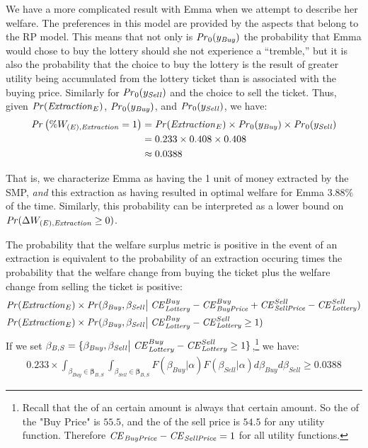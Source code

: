 \documentclass[../main.tex]{subfiles}
\begin{document}
We have a more complicated result with Emma when we attempt to describe her welfare.
The preferences in this model are provided by the aspects that belong to the RP model.
This means that not only is ${\mathit{Pr}}_0(y_{\mathit{Buy}})$ the probability that Emma would chose to buy the lottery should she not experience a \enquote{tremble,} but it is also the probability that the choice to buy the lottery is the result of greater utility being accumulated from the lottery ticket than is associated with the buying price.
Similarly for ${\mathit{Pr}}_0(y_{\mathit{Sell}})$ and the choice to sell the ticket.
Thus, given ${\mathit{Pr}}(\mathit{Extraction}_E)$, ${\mathit{Pr}}_0(y_{\mathit{Buy}})$, and ${\mathit{Pr}}_0(y_{\mathit{Sell}})$, we have:
\begin{align}
	\begin{split}
		{\ensuremath{\mathit{Pr}}}\left(\% W_{(E),\mathit{Extraction}} = 1\right) &= {\mathit{Pr}}(\mathit{Extraction}_E) \times {\ensuremath{\mathit{Pr}}}_0(y_{\mathit{Buy}}) \times {\ensuremath{\mathit{Pr}}}_0(y_{\mathit{Sell}})\\
		&= 0.233 \times 0.408 \times 0.408\\
		&\approx 0.0388
	\end{split}
\end{align}

That is, we characterize Emma as having the 1 unit of money extracted by the SMP, \textit{and} this extraction as having resulted in optimal welfare for Emma $3.88\%$ of the time.
Similarly, this probability can be interpreted as a lower bound on ${\mathit{Pr}}(\Delta W_{(E),\mathit{Extraction}} \geq 0)$.

The probability that the welfare surplus metric is positive in the event of an extraction is equivalent to the probability of an extraction occuring times the probability that the welfare change from buying the ticket plus the welfare change from selling the ticket is positive:
\begin{align*}
{\ensuremath{\mathit{Pr}}}(\mathit{Extraction}_E) &\times {\ensuremath{\mathit{Pr}}}(\beta_{\mathit{Buy}},\beta_{\mathit{Sell}} \big| \; {\mathit{CE}}_{\mathit{Lottery}}^{Buy} - {\mathit{CE}}_{\mathit{Buy Price}}^{Buy} + {\mathit{CE}}_{\mathit{Sell Price}}^{Sell} - {\mathit{CE}}_{\mathit{Lottery}}^{Sell} )\\
{\mathit{Pr}}(\mathit{Extraction}_E) &\times {\ensuremath{\mathit{Pr}}}(\beta_{\mathit{Buy}},\beta_{\mathit{Sell}} \big| \; {\mathit{CE}}_{\mathit{Lottery}}^{Buy} - {\mathit{CE}}_{\mathit{Lottery}}^{Sell} \geq 1 )
\end{align*}
If we set $\mathbf{\beta_{\mathit{B,S}}} = \{ \beta_{\mathit{Buy}},\beta_{\mathit{Sell}} \big| \; {\mathit{CE}}_{\mathit{Lottery}}^{Buy} - {\mathit{CE}}_{\mathit{Lottery}}^{Sell} \geq 1\}$,\footnote{
	Recall that the {\CE} of an certain amount is always that certain amount.
	So the {\CE} of the "Buy Price" is $55.5$, and the {\CE} of the sell price is $54.5$ for any utility function.
	Therefore ${\mathit{CE}}_{\mathit{Buy Price}} - {\mathit{CE}}_{\mathit{Sell Price}} = 1$ for all utility functions.
} we have:
\begin{align}
	0.233 \times \int_{\beta_{\mathit{Buy}} \in \mathbf{\beta_{\mathit{B,S}}}} \int_{\beta_{\mathit{Sell}} \in \mathbf{\beta_{\mathit{B,S}}}} F(\beta_{\mathit{Buy}} | \alpha) F(\beta_{\mathit{Sell}}|\alpha) d\beta_{\mathit{Buy}} d\beta_{\mathit{Sell}} \geq 0.0388
\end{align}
\end{document}
